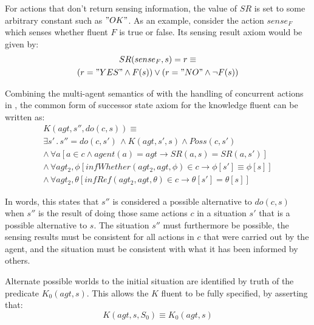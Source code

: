 \documentclass[letterpaper]{article}
\begin{document}
For actions that don't return sensing information, the value of $SR$
is set to some arbitrary constant such as $"OK"$. As an example,
consider the action $sense_{F}$ which senses whether fluent $F$
is true or false. Its sensing result axiom would be given by: \begin{multline*}
SR(sense_{F},s)=r\equiv\\
(r="YES"\wedge F(s))\vee(r="NO"\wedge\neg F(s))\end{multline*}


Combining the multi-agent semantics of \cite{shapiro01casl_feat_inter}
with the handling of concurrent actions in \cite{scherl03conc_knowledge},
the common form of successor state axiom for the knowledge fluent
can be written as:\begin{multline}
K(agt,s'',do(c,s))\equiv\\
\exists s'\,.\, s''=do(c,s')\,\wedge K(agt,s',s)\wedge Poss(c,s')\\
\wedge\,\forall a\left[a\in c\wedge agent(a)=agt\rightarrow SR(a,s)=SR(a,s')\right]\\
\wedge\,\forall agt_{2},\phi\left[infWhether(agt_{2},agt,\phi)\in c\rightarrow\phi[s']\equiv\phi[s]\right]\\
\wedge\,\forall agt_{2},\theta\left[infRef(agt_{2},agt,\theta)\in c\rightarrow\theta[s']=\theta[s]\right]\label{eqn:k_ssa_standard}\end{multline}

In words, this states that $s''$ is considered a possible alternative
to $do(c,s)$ when $s''$ is the result of doing those same actions
$c$ in a situation $s'$ that is a possible alternative to $s$.
The situation $s''$ must furthermore be possible, the sensing results
must be consistent for all actions in $c$ that were carried out by
the agent, and the situation must be consistent with what it has been
informed by others.

Alternate possible worlds to the initial situation are identified
by truth of the predicate $K_{0}(agt,s)$. This allows the $K$ fluent
to be fully specified, by asserting that:\begin{equation}
K(agt,s,S_{0})\equiv K_{0}(agt,s)\end{equation}
\end{document}
